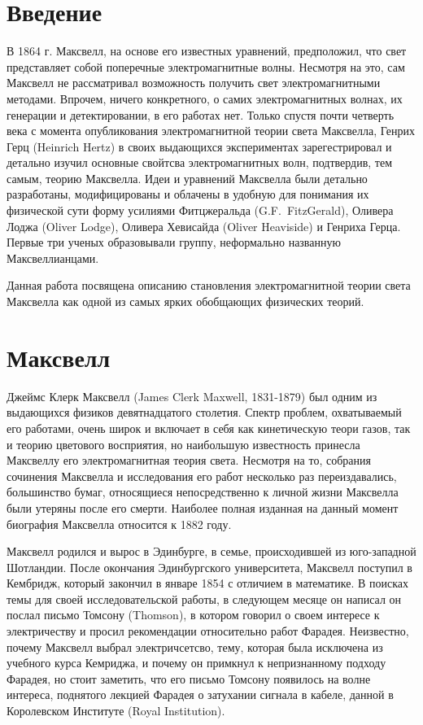 \documentclass[12pt, oneside, a4paper]{article}
\begin{document}
\section*{Введение}
В 1864 г. Максвелл, на основе его известных уравнений, предположил, что свет представляет собой поперечные электромагнитные волны. Несмотря на это, сам Максвелл не рассматривал возможность получить свет электромагнитными методами. Впрочем, ничего конкретного, о самих электромагнитных волнах, их генерации и детектировании, в его работах нет. Только спустя почти четверть века с момента опубликования электромагнитной теории света Максвелла, Генрих Герц (Heinrich Hertz) в своих выдающихся  экспериментах зарегестрировал и детально изучил основные свойтсва электромагнитных волн, подтвердив, тем самым, теорию Максвелла. Идеи и уравнений  Максвелла были детально разработаны, модифицированы и облачены в удобную для понимания их физической сути форму усилиями Фитцжеральда (G.F.~FitzGerald), Оливера Лоджа (Oliver Lodge), Оливера Хевисайда (Oliver Heaviside) и Генриха Герца. Первые три ученых образовывали группу, неформально названную Максвеллианцами. 

Данная работа посвящена описанию становления электромагнитной теории света Максвелла как одной из самых ярких обобщающих физических теорий.

\section*{Максвелл}
Джеймс Клерк Максвелл (James Clerk Maxwell, 1831-1879) был одним из выдающихся физиков девятнадцатого столетия. Спектр проблем, охватываемый его работами, очень широк и включает в себя как кинетическую теори газов, так и теорию цветового восприятия, но наибольшую известность принесла Максвеллу его электромагнитная теория света. Несмотря на то, собрания сочинения Максвелла и исследования его работ несколько раз переиздавались, большинство бумаг, относящиеся непосредственно к личной жизни Максвелла были утеряны после его смерти. Наиболее полная изданная на данный момент биография Максвелла относится к 1882 году.

Максвелл родился и вырос в Эдинбурге, в семье, происходившей из юго-западной Шотландии. После окончания Эдинбургского университета, Максвелл поступил в Кембридж, который закончил в январе 1854 с отличием в математике. В поисках темы для своей исследовательской работы, в следующем месяце он написал он послал письмо Томсону (Thomson), в котором говорил о своем интересе к электричеству и просил рекомендации относительно работ Фарадея. Неизвестно, почему Максвелл выбрал электричсетсво, тему, которая была исключена из учебного курса Кемриджа, и почему он примкнул к непризнанному подходу Фарадея, но стоит заметить, что  его письмо Томсону появилось на волне интереса, поднятого лекцией Фарадея о затухании сигнала в кабеле, данной в Королевском Институте (Royal Institution). 
\end{document}
